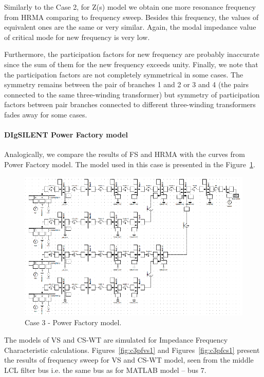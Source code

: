 \documentclass[12pt]{report} %
\begin{document}
Similarly to the Case 2, for Z(s) model we obtain one more resonance frequency from HRMA comparing to frequency sweep. Besides this frequency, the values of equivalent ones are the same or very similar. Again, the modal impedance value of critical mode for new frequency is very low. 

Furthermore, the participation factors for new frequency are probably inaccurate since the sum of them for the new frequency exceeds unity. Finally, we note that the participation factors are not completely symmetrical in some cases. The symmetry remains between the pair of branches 1 and 2 or 3 and 4 (the pairs connected to the same three-winding transformer) but symmetry of participation factors between pair branches connected to different three-winding transformers fades away for some cases.

\paragraph{DIgSILENT Power Factory model}
Analogically, we compare the results of FS and HRMA with the curves from Power Factory model. The model used in this case is presented in the Figure~\ref{fig:c3pfmodel}.

\begin{figure}[htb]
	\centering
	\includegraphics[width=1\textwidth]{img/Case3/PF_model.png}
  	\caption{Case 3 - Power Factory model.}
  	\label{fig:c3pfmodel}
\end{figure}
\FloatBarrier

The models of VS and CS-WT are simulated for Impedance Frequency Characteristic calculations. Figures~\ref{fig:c3pfvs1} and Figures~\ref{fig:c3pfcs1} present the results of frequency sweep for VS and CS-WT model, seen from the middle LCL filter bus i.e. the same bus as for MATLAB model – bus 7.
\end{document}

